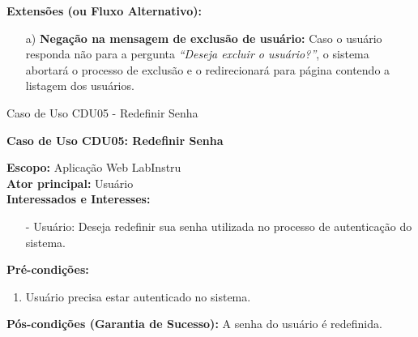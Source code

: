 \begin{quadro}[H]
\begin{framed}
\begin{flushleft}
		\textbf{Extensões (ou Fluxo Alternativo):}
		\begin{itemize}
			\item[a)] \textbf{Negação na mensagem de exclusão de usuário:} Caso o usuário responda não para a pergunta \textit{``Deseja excluir o usuário?''}, o sistema abortará o processo de exclusão e o redirecionará para página contendo a listagem dos usuários.
		\end{itemize}

		\end{flushleft}

	\end{framed}

\end {quadro} %



\begin{quadro}[H]
	\centering
	\caption{Caso de Uso CDU05 - Redefinir Senha}

	\begin{framed}

		\textbf{Caso de Uso CDU05: Redefinir Senha}\\

		\begin{flushleft}

		\textbf{Escopo:} Aplicação Web LabInstru\\

		\textbf{Ator principal:} Usuário\\

		\textbf{Interessados e Interesses:}
		\begin{itemize}
			\item[-] Usuário: Deseja redefinir sua senha utilizada no processo de autenticação do sistema.
		\end{itemize}

		\textbf{Pré-condições:}\\
			 \begin{enumerate}
			 	\item{Usuário precisa estar autenticado no sistema.}
			 \end{enumerate}

		\textbf{Pós-condições (Garantia de Sucesso):} A senha do usuário é redefinida.\\


\end{flushleft}
\end{framed}
\end{quadro}
